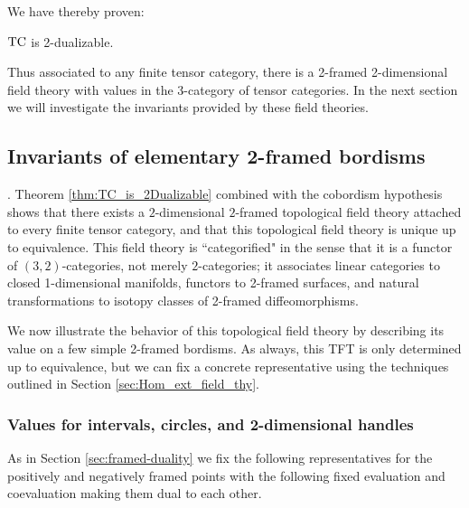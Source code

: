 \documentclass{amsart}
\begin{document}
We have thereby proven:
\begin{maintheorem} \label{thm:TC_is_2Dualizable}
	$\mathrm{TC}$ is 2-dualizable. 
\end{maintheorem}

\nid Thus associated to any finite tensor category, there is a 2-framed 2-dimensional field theory with values in the 3-category of tensor categories.  In the next section we will investigate the invariants provided by these field theories.

\subsection{Invariants of elementary 2-framed bordisms}
. %
Theorem \ref{thm:TC_is_2Dualizable} combined with the cobordism hypothesis shows that there exists a $2$-dimensional $2$-framed topological field theory attached to every finite tensor category, and that this topological field theory is unique up to equivalence.  This field theory is ``categorified" in the sense that it is a functor of $(3,2)$-categories, not merely $2$-categories; it associates linear categories to closed 1-dimensional manifolds, functors to 2-framed surfaces, and natural transformations to isotopy classes of 2-framed diffeomorphisms. 

We now illustrate the behavior of this topological field theory by describing its value on a few simple 2-framed bordisms.  As always, this TFT is only determined up to equivalence, but we can fix a concrete representative using the techniques outlined in Section \ref{sec:Hom_ext_field_thy}.

\subsubsection{Values for intervals, circles, and 2-dimensional handles}

As in Section \ref{sec:framed-duality} we fix the following representatives for the positively and negatively framed points with the following fixed evaluation and coevaluation making them dual to each other.
\end{document}
